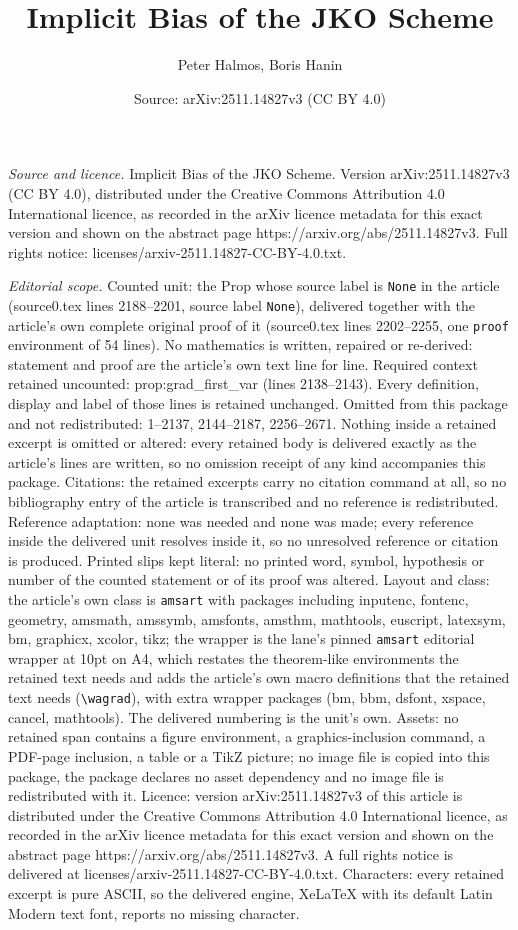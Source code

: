 \documentclass[10pt,a4paper]{amsart}
\title[Implicit Bias of the JKO Scheme]{Implicit Bias of the JKO Scheme}
\author{Peter Halmos, Boris Hanin}
\date{Source: arXiv:2511.14827v3 (CC BY 4.0)}
\begin{document}
\maketitle

\noindent\emph{Source and licence.} Implicit Bias of the JKO Scheme. Version arXiv:2511.14827v3 (CC BY 4.0), distributed under the Creative Commons Attribution 4.0 International licence, as recorded in the arXiv licence metadata for this exact version and shown on the abstract page https://arxiv.org/abs/2511.14827v3. Full rights notice: licenses/arxiv-2511.14827-CC-BY-4.0.txt.\par\smallskip

\noindent\textit{Editorial scope.} Counted unit: the Prop whose source label is \texttt{None} in the article (source0.tex lines 2188--2201, source label \texttt{None}), delivered together with the article's own complete original proof of it (source0.tex lines 2202--2255, one \texttt{proof} environment of 54 lines). No mathematics is written, repaired or re-derived: statement and proof are the article's own text line for line. Required context retained uncounted: prop:grad\_first\_var (lines 2138--2143). Every definition, display and label of those lines is retained unchanged. Omitted from this package and not redistributed: 1--2137, 2144--2187, 2256--2671. Nothing inside a retained excerpt is omitted or altered: every retained body is delivered exactly as the article's lines are written, so no omission receipt of any kind accompanies this package. Citations: the retained excerpts carry no citation command at all, so no bibliography entry of the article is transcribed and no reference is redistributed. Reference adaptation: none was needed and none was made; every reference inside the delivered unit resolves inside it, so no unresolved reference or citation is produced. Printed slips kept literal: no printed word, symbol, hypothesis or number of the counted statement or of its proof was altered. Layout and class: the article's own class is \texttt{amsart} with packages including inputenc, fontenc, geometry, amsmath, amssymb, amsfonts, amsthm, mathtools, euscript, latexsym, bm, graphicx, xcolor, tikz; the wrapper is the lane's pinned \texttt{amsart} editorial wrapper at 10pt on A4, which restates the theorem-like environments the retained text needs and adds the article's own macro definitions that the retained text needs (\texttt{\textbackslash wagrad}), with extra wrapper packages (bm, bbm, dsfont, xspace, cancel, mathtools). The delivered numbering is the unit's own. Assets: no retained span contains a figure environment, a graphics-inclusion command, a PDF-page inclusion, a table or a TikZ picture; no image file is copied into this package, the package declares no asset dependency and no image file is redistributed with it. Licence: version arXiv:2511.14827v3 of this article is distributed under the Creative Commons Attribution 4.0 International licence, as recorded in the arXiv licence metadata for this exact version and shown on the abstract page https://arxiv.org/abs/2511.14827v3. A full rights notice is delivered at licenses/arxiv-2511.14827-CC-BY-4.0.txt. Characters: every retained excerpt is pure ASCII, so the delivered engine, XeLaTeX with its default Latin Modern text font, reports no missing character.
\end{document}
